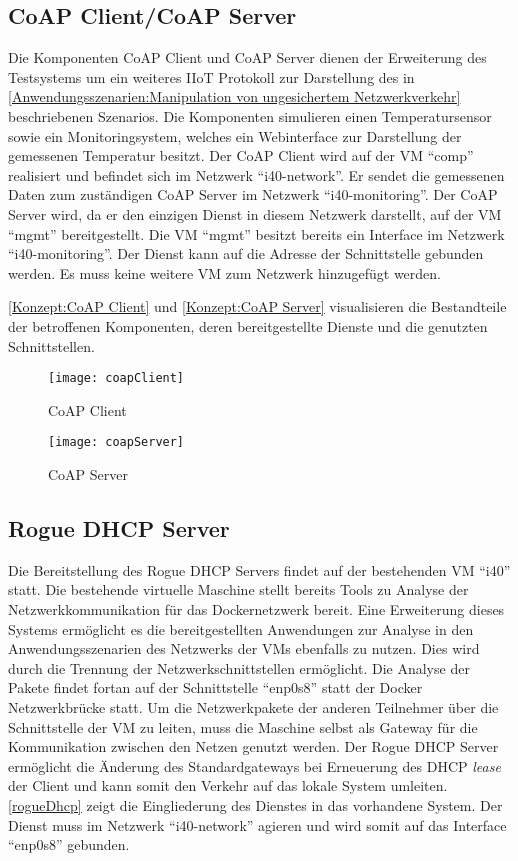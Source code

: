 \subsection{CoAP Client/CoAP Server}
Die Komponenten \ac{CoAP} Client und \ac{CoAP} Server dienen der Erweiterung des Testsystems um ein weiteres \ac{IIoT} Protokoll zur Darstellung des in \autoref{Anwendungsszenarien:Manipulation von ungesichertem Netzwerkverkehr} beschriebenen Szenarios. Die Komponenten simulieren einen Temperatursensor sowie ein Monitoringsystem, welches ein Webinterface zur Darstellung der gemessenen Temperatur besitzt. Der \ac{CoAP} Client wird auf der \ac{VM} "`comp"' realisiert und befindet sich im Netzwerk "`i40-network"'. Er sendet die gemessenen Daten zum zuständigen \ac{CoAP} Server im Netzwerk "`i40-monitoring"'. Der \ac{CoAP} Server wird, da er den einzigen Dienst in diesem Netzwerk darstellt, auf der \ac{VM} "`mgmt"' bereitgestellt. Die \ac{VM} "`mgmt"' besitzt bereits ein Interface im Netzwerk "`i40-monitoring"'. Der Dienst kann auf die Adresse der Schnittstelle gebunden werden. Es muss keine weitere \ac{VM} zum Netzwerk hinzugefügt werden.

\autoref{Konzept:CoAP Client} und \autoref{Konzept:CoAP Server} visualisieren die Bestandteile der betroffenen Komponenten, deren bereitgestellte Dienste und die genutzten Schnittstellen.

\begin{figure}[h]
  \centering
  \texttt{[image: coapClient]}
  \caption{CoAP Client} 
  \label{Konzept:CoAP Client}
\end{figure}

\begin{figure}[h]
  \centering
  \texttt{[image: coapServer]}
  \caption{CoAP Server} 
  \label{Konzept:CoAP Server}
\end{figure}

\subsection{Rogue DHCP Server}
Die Bereitstellung des Rogue \ac{DHCP} Servers findet auf der bestehenden \ac{VM} "`i40"' statt. Die bestehende virtuelle Maschine stellt bereits Tools zu Analyse der Netzwerkkommunikation für das Dockernetzwerk bereit. Eine Erweiterung dieses Systems ermöglicht es die bereitgestellten Anwendungen zur Analyse in den Anwendungsszenarien des Netzwerks der \ac{VM}s ebenfalls zu nutzen. Dies wird durch die Trennung der Netzwerkschnittstellen ermöglicht. Die Analyse der Pakete findet fortan auf der Schnittstelle "`enp0s8"' statt der Docker Netzwerkbrücke statt. Um die Netzwerkpakete der anderen Teilnehmer über die Schnittstelle der \ac{VM} zu leiten, muss die Maschine selbst als Gateway für die Kommunikation zwischen den Netzen genutzt werden. Der Rogue \ac{DHCP} Server ermöglicht die Änderung des Standardgateways bei Erneuerung des \ac{DHCP} \textit{lease} der Client und kann somit den Verkehr auf das lokale System umleiten. \autoref{rogueDhcp} zeigt die Eingliederung des Dienstes in das vorhandene System. Der Dienst muss im Netzwerk "`i40-network"' agieren und wird somit auf das Interface "`enp0s8"' gebunden.

